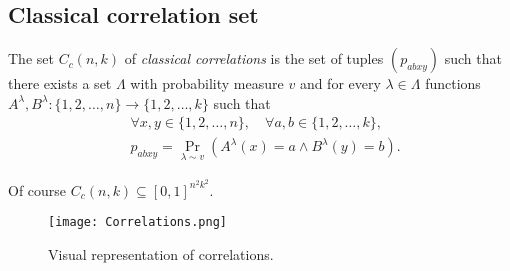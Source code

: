 
\subsection{Classical correlation set}\label{sec:classical-correlation-set}

\begin{defn}\label{defn:classical-correlation-set}
    The set $C_{c}(n, k)$ of \emph{classical correlations} is the set of tuples $\left(p_{a b x y}\right)$ such that there exists a set $\Lambda$ with probability measure $v$ and for every $\lambda \in \Lambda$ functions $A^{\lambda}, B^{\lambda}:\{1,2, \ldots, n\} \rightarrow\{1,2, \ldots, k\}$ such that
    \begin{equation}
        \begin{split}
    &\forall x, y \in\{1,2, \ldots, n\}, \quad \forall a, b \in\{1,2, \ldots, k\}, \\
     &p_{a b x y}  =\operatorname{Pr}_{\lambda \sim v}\left(A^{\lambda}(x)=a \wedge B^{\lambda}(y)=b\right) .
        \end{split}
    \end{equation}

    Of course $C_{c}(n, k) \subseteq [0,1]^{n^2k^2}$.
\end{defn}


\begin{figure}[htb]
    \texttt{[image: Correlations.png]}
    \centering
    \caption{Visual representation of correlations.}
    \end{figure}